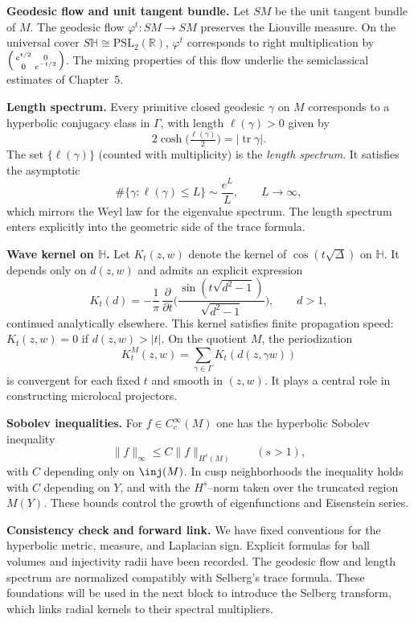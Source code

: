 \medskip
\noindent\textbf{Geodesic flow and unit tangent bundle.}
Let $SM$ be the unit tangent bundle of $M$.
The geodesic flow $\varphi^{t}:SM\to SM$ preserves the Liouville measure.
On the universal cover $S\mathbb{H}\cong\mathrm{PSL}_{2}(\mathbb{R})$,
$\varphi^{t}$ corresponds to right multiplication by
$\begin{psmallmatrix} e^{t/2} & 0 \\ 0 & e^{-t/2}\end{psmallmatrix}$.
The mixing properties of this flow underlie the semiclassical estimates of Chapter~5.

\medskip
\noindent\textbf{Length spectrum.}
Every primitive closed geodesic $\gamma$ on $M$ corresponds to a hyperbolic conjugacy class in $\Gamma$,
with length $\ell(\gamma)>0$ given by
\[
  2\cosh\!\Big(\tfrac{\ell(\gamma)}{2}\Big) = |\operatorname{tr} \gamma|.
\]
The set $\{\ell(\gamma)\}$ (counted with multiplicity) is the \emph{length spectrum}.
It satisfies the asymptotic
\[
  \#\{\gamma : \ell(\gamma)\le L\} \sim \frac{e^{L}}{L},
  \qquad L\to\infty,
\]
which mirrors the Weyl law for the eigenvalue spectrum.
The length spectrum enters explicitly into the geometric side of the trace formula.

\medskip
\noindent\textbf{Wave kernel on $\mathbb{H}$.}
Let $K_{t}(z,w)$ denote the kernel of $\cos(t\sqrt{\Delta})$ on $\mathbb{H}$.
It depends only on $d(z,w)$ and admits an explicit expression
\[
  K_{t}(d) = -\frac{1}{\pi}\,\frac{\partial}{\partial t}\Big(\frac{\sin(t\sqrt{d^{2}-1})}{\sqrt{d^{2}-1}}\Big), \qquad d>1,
\]
continued analytically elsewhere.
This kernel satisfies finite propagation speed:
$K_{t}(z,w)=0$ if $d(z,w)>|t|$.
On the quotient $M$, the periodization
\[
  K^{M}_{t}(z,w) = \sum_{\gamma\in\Gamma} K_{t}(d(z,\gamma w))
\]
is convergent for each fixed $t$ and smooth in $(z,w)$.
It plays a central role in constructing microlocal projectors.

\medskip
\noindent\textbf{Sobolev inequalities.}
For $f\in C_{c}^{\infty}(M)$ one has the hyperbolic Sobolev inequality
\[
  \|f\|_{\infty} \le C \|f\|_{H^{s}(M)} \qquad (s>1),
\]
with $C$ depending only on $\inj(M)$.
In cusp neighborhoods the inequality holds with $C$ depending on $Y$,
and with the $H^{s}$–norm taken over the truncated region $M(Y)$.
These bounds control the growth of eigenfunctions and Eisenstein series.

\medskip
\noindent\textbf{Consistency check and forward link.}
We have fixed conventions for the hyperbolic metric, measure, and Laplacian sign.
Explicit formulas for ball volumes and injectivity radii have been recorded.
The geodesic flow and length spectrum are normalized compatibly with Selberg’s trace formula.
These foundations will be used in the next block to introduce the Selberg transform,
which links radial kernels to their spectral multipliers.
